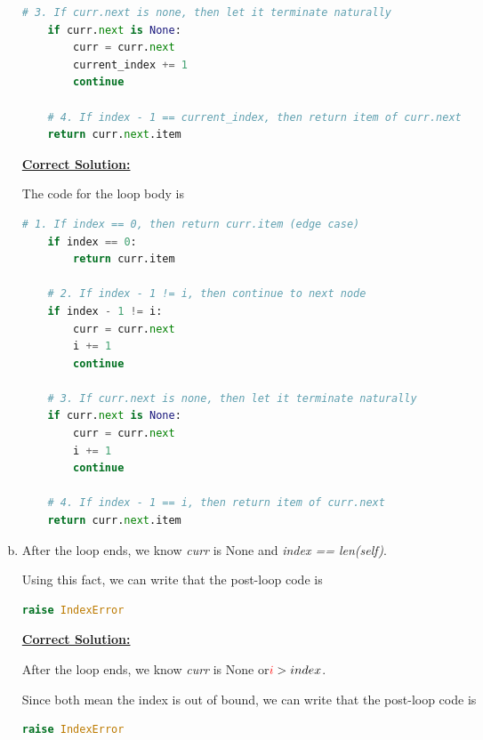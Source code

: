 \documentclass[12pt]{article}
\begin{document}
\begin{enumerate}[a.]
\begin{lstlisting}[language=Python]
    # 3. If curr.next is none, then let it terminate naturally
    if curr.next is None:
        curr = curr.next
        current_index += 1
        continue

    # 4. If index - 1 == current_index, then return item of curr.next
    return curr.next.item
    \end{lstlisting}

    \newpage

    \begin{mdframed}
    \underline{\textbf{Correct Solution:}}

    \bigskip

    The code for the loop body is
    \begin{lstlisting}[language=Python]
    # 1. If index == 0, then return curr.item (edge case)
    if index == 0:
        return curr.item

    # 2. If index - 1 != i, then continue to next node
    if index - 1 != i:
        curr = curr.next
        i += 1
        continue

    # 3. If curr.next is none, then let it terminate naturally
    if curr.next is None:
        curr = curr.next
        i += 1
        continue

    # 4. If index - 1 == i, then return item of curr.next
    return curr.next.item
    \end{lstlisting}
    \end{mdframed}

    \item

    After the loop ends, we know \textit{curr} is None and \textit{index == len(self)}.

    \bigskip

    Using this fact, we can write that the post-loop code is

    \begin{lstlisting}[language=Python]
    raise IndexError
    \end{lstlisting}

    \bigskip

    \begin{mdframed}
    \underline{\textbf{Correct Solution:}}

    \bigskip

    After the loop ends, we know \textit{curr} is None \color{red}or\color{black}\:$\color{red}i\color{black} > index$.

    \bigskip

    Since \color{red}both mean the index is out of bound\color{black}, we can write that the post-loop code is

    \begin{lstlisting}[language=Python]
    raise IndexError
    \end{lstlisting}
    \end{mdframed}


\end{enumerate}
\end{document}
